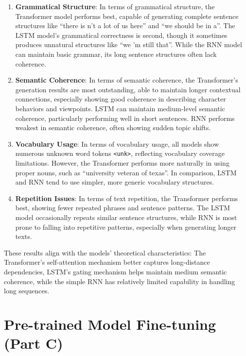 \documentclass[12pt,oneside]{article}
\begin{document}
\begin{enumerate}
\item \textbf{Grammatical Structure}: In terms of grammatical structure, the Transformer model performs best, capable of generating complete sentence structures like ``there is n't a lot of us here'' and ``we should be in a''. The LSTM model's grammatical correctness is second, though it sometimes produces unnatural structures like ``we 'm still that''. While the RNN model can maintain basic grammar, its long sentence structures often lack coherence.

\item \textbf{Semantic Coherence}: In terms of semantic coherence, the Transformer's generation results are most outstanding, able to maintain longer contextual connections, especially showing good coherence in describing character behaviors and viewpoints. LSTM can maintain medium-level semantic coherence, particularly performing well in short sentences. RNN performs weakest in semantic coherence, often showing sudden topic shifts.

\item \textbf{Vocabulary Usage}: In terms of vocabulary usage, all models show numerous unknown word tokens \texttt{<unk>}, reflecting vocabulary coverage limitations. However, the Transformer performs more naturally in using proper nouns, such as ``university veteran of texas''. In comparison, LSTM and RNN tend to use simpler, more generic vocabulary structures.

\item \textbf{Repetition Issues}: In terms of text repetition, the Transformer performs best, showing fewer repeated phrases and sentence patterns. The LSTM model occasionally repeats similar sentence structures, while RNN is most prone to falling into repetitive patterns, especially when generating longer texts.
\end{enumerate}

These results align with the models' theoretical characteristics: The Transformer's self-attention mechanism better captures long-distance dependencies, LSTM's gating mechanism helps maintain medium semantic coherence, while the simple RNN has relatively limited capability in handling long sequences.

\section{Pre-trained Model Fine-tuning (Part C)}
\end{document}
